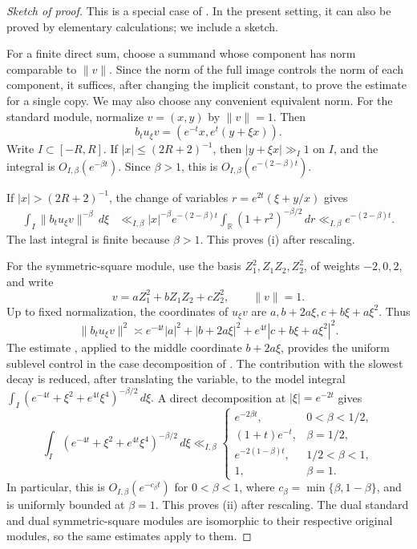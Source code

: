 \documentclass[reqno,11pt]{amsart}
\theoremstyle{definition}
\theoremstyle{remark}
\numberwithin{equation}{section}
\begin{document}
\begin{proof}[Sketch of proof]
This is a special case of
\cite[Lemma~5.1]{eskin-margulis-mozes:1998}. In the present setting, it
can also be proved by elementary calculations; we include a sketch.

For a finite direct sum, choose a summand whose component has norm
comparable to $\|v\|$. Since the norm of the full image controls the norm
of each component, it suffices, after changing the implicit constant, to
prove the estimate for a single copy. We may also choose any convenient
equivalent norm.
For the standard module, normalize $v=(x,y)$ by $\|v\|=1$. Then
$$
b_tu_\xi v=(e^{-t}x,e^t(y+\xi x)).
$$
Write $I\subset[-R,R]$. If $|x|\le(2R+2)^{-1}$, then
$|y+\xi x|\gg_I1$ on $I$, and the integral is
$O_{I,\beta}(e^{-\beta t})$. Since $\beta>1$, this is
$O_{I,\beta}(e^{-(2-\beta)t})$.

If $|x|>(2R+2)^{-1}$, the change of variables
$r=e^{2t}(\xi+y/x)$ gives
$$
\begin{aligned}
\int_I\|b_tu_\xi v\|^{-\beta}\,d\xi
&\ll_{I,\beta}
|x|^{-\beta}e^{-(2-\beta)t}
\int_{\mathbb R}(1+r^2)^{-\beta/2}\,dr \ll_{I,\beta}
e^{-(2-\beta)t}.
\end{aligned}
$$
The last integral is finite because $\beta>1$. This proves
\textnormal{(i)} after rescaling.

For the symmetric-square module, use the basis
$Z_1^2,Z_1Z_2,Z_2^2$, of weights $-2,0,2$, and write
$$
v=aZ_1^2+bZ_1Z_2+cZ_2^2,
\qquad
\|v\|=1.
$$
Up to fixed normalization, the coordinates of $u_\xi v$ are
$a, b+2a\xi, c+b\xi+a\xi^2$.
Thus
$$
\|b_tu_\xi v\|^2
\asymp
e^{-4t}|a|^2
+
|b+2a\xi|^2
+
e^{4t}|c+b\xi+a\xi^2|^2.
$$
The estimate , applied to the
middle coordinate $b+2a\xi$, provides the uniform sublevel control
in the case decomposition of
\cite[Lemma~5.1]{eskin-margulis-mozes:1998}. The contribution with the
slowest decay is reduced, after translating the variable, to the model
integral
$
\int_I
\left(e^{-4t}+\xi^2+e^{4t}\xi^4\right)^{-\beta/2}\,d\xi.
$
A direct decomposition at $|\xi|=e^{-2t}$ gives
$$
\int_I
\left(e^{-4t}+\xi^2+e^{4t}\xi^4\right)^{-\beta/2}\,d\xi
\ll_{I,\beta}
\begin{cases}
e^{-2\beta t},&0<\beta<1/2,\\
(1+t)e^{-t},&\beta=1/2,\\
e^{-2(1-\beta)t},&1/2<\beta<1,\\
1,&\beta=1.
\end{cases}
$$
In particular, this is $O_{I,\beta}(e^{-c_\beta t})$ for
$0<\beta<1$, where $c_\beta=\min\{\beta,1-\beta\}$, and is uniformly
bounded at $\beta=1$. This proves \textnormal{(ii)} after rescaling. The dual standard and dual symmetric-square modules are isomorphic to
their respective original modules, so the same estimates apply to them.
\end{proof}
\end{document}
